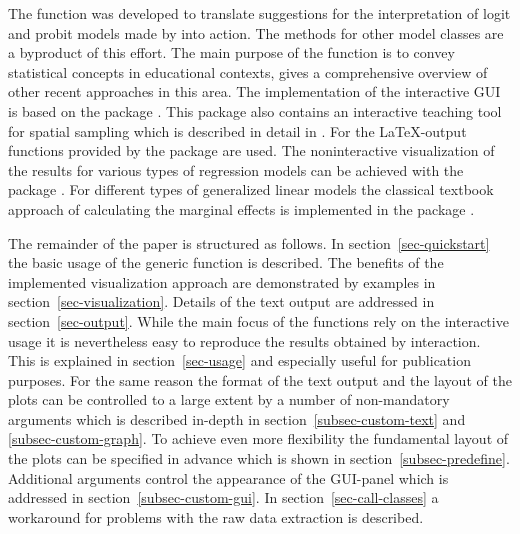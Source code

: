 \documentclass[nojss]{jss}
\begin{document}
The function  was developed to translate suggestions for the interpretation of logit and probit models made by \citet{Hoet2007} into action. The methods for other model classes are a byproduct of this effort. The main purpose of the function is to convey statistical concepts in educational contexts, \citet{Xie2013} gives a comprehensive overview of other recent approaches in this area. The implementation of the interactive GUI is based on the package  \citep{BowmCrawAlex2007}. This package also contains an interactive teaching tool for spatial sampling which is described in detail in \citet{BowmGibsScot2010}. For the \LaTeX-output functions provided by the package  \citep{Dahl2014} are used. The noninteractive visualization of the results for various types of regression models can be achieved with the package  \citep{Fox2003}. For different types of generalized linear models the classical textbook approach of calculating the marginal effects is implemented in the package  \citep{Fern2014}.  

The remainder of the paper is structured as follows. In section~\ref{sec-quickstart} the basic usage of the generic function  is described. The benefits of the implemented  visualization approach are demonstrated by examples  in section~\ref{sec-visualization}.  Details of the text output are addressed in section~\ref{sec-output}. While the main focus of the functions rely on the interactive usage it is nevertheless easy to reproduce the results obtained by interaction. This is explained in section~\ref{sec-usage} and especially useful for publication purposes. For the same reason the format of the text output and the layout of the plots  can be controlled to a large extent by a number of non-mandatory arguments which is described in-depth in section~\ref{subsec-custom-text} and \ref{subsec-custom-graph}. To achieve even more flexibility the fundamental layout of the plots can be specified in advance which is shown in section~\ref{subsec-predefine}. Additional arguments control the appearance of the GUI-panel which is addressed in section~\ref{subsec-custom-gui}. In section~\ref{sec-call-classes} a workaround for problems with the raw data extraction is described.

\newpage
\end{document}

